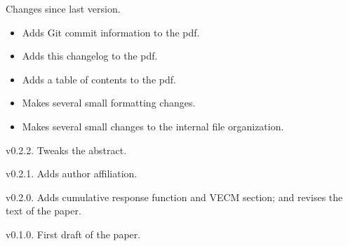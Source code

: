\begin{description}
\item{Changes since last version.}
  \begin{itemize}[noitemsep]
  \item Adds Git commit information to the pdf.
  \item Adds this changelog to the pdf.
  \item Adds a table of contents to the pdf.
  \item Makes several small formatting changes.
  \item Makes several small changes to the internal file organization.
  \end{itemize}

\item{v0.2.2.} Tweaks the abstract.

\item{v0.2.1.} Adds author affiliation.

\item{v0.2.0.} Adds cumulative response function and VECM section; and
  revises the text of the paper.

\item{v0.1.0.} First draft of the paper.
\end{description}


